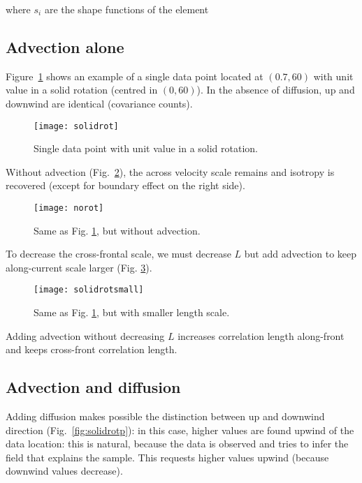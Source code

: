 where $s_i$ are the shape functions of the element

\subsection{Advection alone}

Figure~\ref{fig:solidrot} shows an example of a single data point located at $(0.7,60)$ with unit value in a solid 
rotation (centred in $(0,60)$). In the absence of diffusion, up and downwind are identical (covariance 
counts).

\begin{figure}[H]
\parbox{.6\textwidth}{
\texttt{[image: solidrot]}
}\parbox{.4\textwidth}{
\caption{Single data point with unit value in a solid 
rotation.\label{fig:solidrot}}
}
\end{figure}


Without advection (Fig.~\ref{fig:norot}), the across velocity scale remains and isotropy is 
recovered (except for boundary effect on the right side).

\begin{figure}[H]
\parbox{.6\textwidth}{
\texttt{[image: norot]}
}\parbox{.4\textwidth}{
\caption{Same as Fig. \ref{fig:solidrot}, but without advection. \label{fig:norot}}
}
\end{figure}

To decrease the cross-frontal scale, we must decrease $L$ but add advection 
to keep along-current scale larger (Fig. \ref{fig:solidrotsmall}).

\begin{figure}[H]
\parbox{.6\textwidth}{
\texttt{[image: solidrotsmall]}
}\parbox{.4\textwidth}{
\caption{Same as Fig. \ref{fig:solidrot}, but with smaller length scale. \label{fig:solidrotsmall}}
}
\end{figure}

Adding advection without decreasing $L$ increases correlation length 
along-front and keeps cross-front correlation length.

\subsection{Advection and diffusion}

Adding diffusion  makes possible the distinction between up and downwind 
direction (Fig.~\ref{fig:solidrotp}): in this case, higher values are found upwind of the data 
location: this is natural, because the data is observed and \diva tries to 
infer the field that explains the sample. This requests higher values 
upwind (because downwind values decrease).

